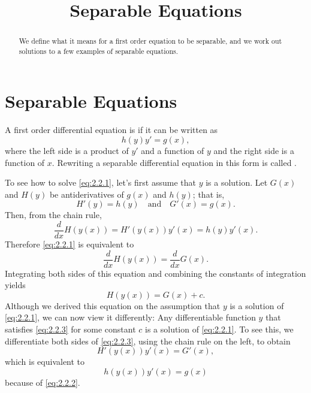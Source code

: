 \documentclass{ximera}
\title{Separable Equations}
\begin{document}
 
\begin{abstract}
We define what it means for a first order equation to be separable, and we work out solutions to a few examples of separable equations.
\end{abstract}
 
\maketitle
 
\section*{Separable Equations}
 
 
A first order differential equation  is   if it can be written as
\begin{equation} \label{eq:2.2.1}
h(y)y'=g(x),
\end{equation}
where the left side is a product of $y'$ and a function of $y$ and
the right side is a function of $x$. Rewriting a separable
differential equation in this form is called .
 
 
To see how to solve \eqref{eq:2.2.1}, let's first assume that $y$
is a solution.
Let  $G(x)$ and $H(y)$ be antiderivatives of $g(x)$
and $h(y)$; that is,
\begin{equation} \label{eq:2.2.2}
H'(y)=h(y)\quad\text{and}\quad G'(x)=g(x).
\end{equation}
Then, from the chain rule,
$$
\frac{d}{dx}H(y(x))=H'(y(x))y'(x)=h(y)y'(x).
$$
Therefore \eqref{eq:2.2.1} is equivalent to
$$
\frac{d}{dx}H(y(x))=\frac{d}{dx}G(x).
$$
Integrating both sides of this equation and combining the constants of
integration yields
\begin{equation} \label{eq:2.2.3}
H(y(x))=G(x)+c.
\end{equation}
Although we derived this equation on the assumption that $y$
is a solution of \eqref{eq:2.2.1}, we can now view it differently:
Any differentiable function $y$ that satisfies \eqref{eq:2.2.3}
for some constant $c$ is a solution of \eqref{eq:2.2.1}. To see this, we
differentiate both sides of \eqref{eq:2.2.3}, using the chain rule on the
left, to obtain
$$
H'(y(x))y'(x)=G'(x),
$$
which is equivalent to
$$
h(y(x))y'(x)=g(x)
$$
because of \eqref{eq:2.2.2}.
 
\end{document}
